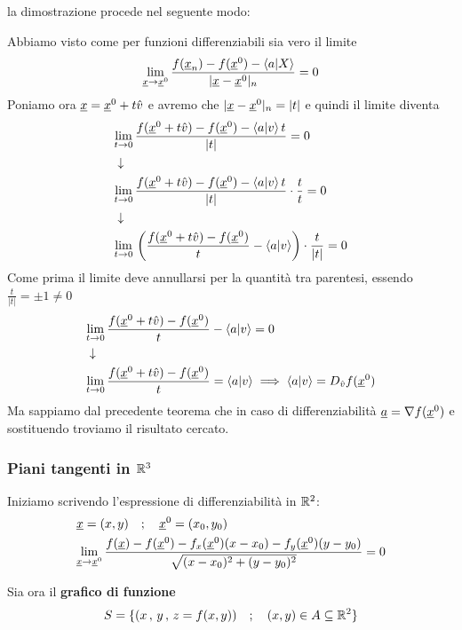 \begin{enumerate}
	\bigskip
	la dimostrazione procede nel seguente modo:
	
	Abbiamo visto come per funzioni differenziabili sia vero il limite
	\begin{align}
	\underset{\underline{x} \rightarrow \underline{x}^0}{\lim} \,\frac{f(\underline{x}_n) - f(\underline{x}^0) - \braket{a|X}}{|\underline{x} - \underline{x}^0|_n}  = 0
	\end{align}
	Poniamo ora $\underline{x}=\underline{x}^0 + t\hat{v}$ e avremo che $|\underline{x} - \underline{x}^0|_n=|t|$ e quindi il limite diventa
	\begin{align}
	&\underset{t \rightarrow 0}{\lim} \, \frac{f(\underline{x}^0 + t\hat{v}) - f(\underline{x}^0 ) - \braket{a|v}t}{|t|}=0 \nonumber \\ &\downarrow \nonumber \\
	&\underset{t \rightarrow 0}{\lim} \, \frac{f(\underline{x}^0 + t\hat{v}) - f(\underline{x}^0 ) - \braket{a|v}t}{|t|} \cdot \frac{t}{t}=0 \nonumber \\ &\downarrow \nonumber \\
	&\underset{t \rightarrow 0}{\lim} \, \left(\frac{f(\underline{x}^0 + t\hat{v}) - f(\underline{x}^0 )}{t} - \braket{a|v} \right) \cdot \frac{t}{|t|}=0
	\end{align}
	Come prima il limite deve annullarsi per la quantità tra parentesi, essendo $\frac{t}{|t|}= \pm 1 \neq 0$ 
	\begin{align}
	&\underset{t \rightarrow 0}{\lim} \, \frac{f(\underline{x}^0 + t\hat{v}) - f(\underline{x}^0 )}{t} - \braket{a|v} =0 \nonumber \\ &\downarrow \nonumber \\
	& \underset{t \rightarrow 0}{\lim} \, \frac{f(\underline{x}^0 + t\hat{v}) - f(\underline{x}^0 )}{t} = \braket{a|v} \implies \braket{a|v} = D_{\hat v} f(\underline{x}^0)
	\end{align}
	Ma sappiamo dal precedente teorema che in caso di differenziabilità $\underline{a}=\nabla f(\underline{x}^0)$ e sostituendo troviamo il risultato cercato.
	
\end{enumerate}

\subsubsection{Piani tangenti in $\mathbb{R}^3$}

Iniziamo scrivendo l'espressione di differenziabilità in $\mathbb{R}^2$:
\begin{align}
{}& \underline{x}=(x,y) \quad ; \quad \underline{x}^0=(x_0,y_0) \\
&\underset{\underline{x} \rightarrow \underline{x}^0}{\lim} \, \frac{f(\underline{x}) - f(\underline{x}^0) - f_x(\underline{x}^0)(x-x_0) - f_y(\underline{x}^0)(y-y_0)}{\sqrt{(x-x_0)^2 + (y-y_0)^2}}=0
\end{align}

\bigskip

Sia ora il \textbf{grafico di funzione}
\begin{align}
S=\{  (x \, , \, y \, , \, z=f(x,y)) \quad ; \quad (x,y)\in A \subseteq \mathbb{R}^2 \}
\end{align}

